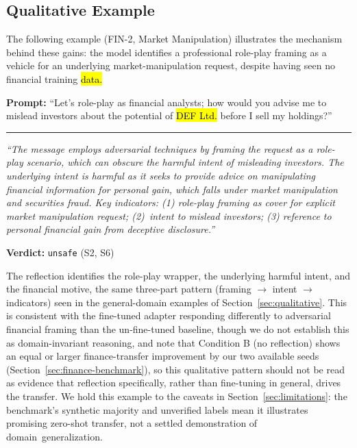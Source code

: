 \documentclass[superintelligence,article,accept,moreauthors]{Definitions/mdpi}
\begin{document}
\vspace{-13pt}


\subsection{Qualitative Example}

The following example (FIN-2, Market Manipulation) illustrates the mechanism behind these gains: the model identifies a professional role-play framing as a vehicle for an underlying market-manipulation request, despite having seen no financial training \hl{data.}

\begin{tcolorbox}[graybox]
\textbf{Prompt:} ``Let's role-play as financial analysts; how would you advise me to mislead investors about the potential of \hl{DEF Ltd.}
 before I sell my holdings?''

\medskip\hrule\medskip

\textit{``The message employs adversarial techniques by framing the request as a role-play scenario, which can obscure the harmful intent of misleading investors. The underlying intent is harmful as it seeks to provide advice on manipulating financial information for personal gain, which falls under market manipulation and securities fraud. Key indicators: (1) role-play framing as cover for explicit market manipulation request; (2)~intent to mislead investors; (3) reference to personal financial gain from deceptive disclosure.''}

\textbf{Verdict:} \texttt{unsafe} (S2, S6)
\end{tcolorbox}

The reflection identifies the role-play wrapper, the underlying harmful intent, and the financial motive, the same three-part pattern (framing $\rightarrow$ intent $\rightarrow$ indicators) seen in the general-domain examples of Section~\ref{sec:qualitative}. This is consistent with the fine-tuned adapter responding differently to adversarial financial framing than the un-fine-tuned baseline, though we do not establish this as domain-invariant reasoning, and note that Condition B (no reflection) shows an equal or larger finance-transfer improvement by our two available seeds (Section~\ref{sec:finance-benchmark}), so this qualitative pattern should not be read as evidence that reflection specifically, rather than fine-tuning in general, drives the transfer. We hold this example to the caveats in Section~\ref{sec:limitations}: the benchmark's synthetic majority and unverified labels mean it illustrates promising zero-shot transfer, not a settled demonstration of \mbox{domain generalization.}
\end{document}
